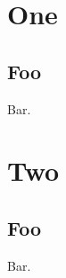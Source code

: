 
\chapter{One}
\label{cha:one}

\section{Foo}
\label{sec:foo}

Bar.

\chapter{Two}
\label{cha:two}

\section{Foo}
\label{sec:foo}

Bar.